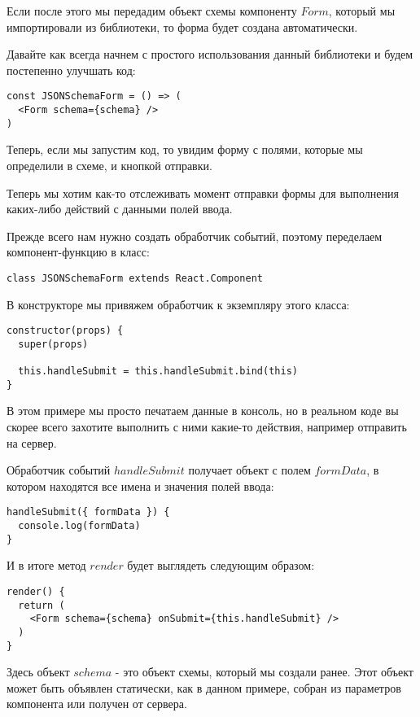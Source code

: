 Если после этого мы передадим объект схемы компоненту $Form$, который мы импортировали из библиотеки, то форма будет создана автоматически.

Давайте как всегда начнем с простого использования данный библиотеки и будем постепенно улучшать код:

\begin{lstlisting}
const JSONSchemaForm = () => (
  <Form schema={schema} />
)
\end{lstlisting}

Теперь, если мы запустим код, то увидим форму с полями, которые мы определили в схеме, и кнопкой отправки.

Теперь мы хотим как-то отслеживать момент отправки формы для выполнения каких-либо действий с данными полей ввода.

Прежде всего нам нужно создать обработчик событий, поэтому переделаем компонент-функцию в класс:

\begin{lstlisting}
class JSONSchemaForm extends React.Component
\end{lstlisting}

В конструкторе мы привяжем обработчик к экземпляру этого класса:

\begin{lstlisting}
constructor(props) {
  super(props)
  
  this.handleSubmit = this.handleSubmit.bind(this)
}
\end{lstlisting}

В этом примере мы просто печатаем данные в консоль, но в реальном коде вы скорее всего захотите выполнить с ними какие-то действия, например отправить на сервер.

Обработчик событий $handleSubmit$ получает объект с полем $formData$, в котором находятся все имена и значения полей ввода:

\begin{lstlisting}
handleSubmit({ formData }) {
  console.log(formData)
}
\end{lstlisting}

И в итоге метод $render$ будет выглядеть следующим образом:

\begin{lstlisting}
render() {
  return (
    <Form schema={schema} onSubmit={this.handleSubmit} />
  )
}
\end{lstlisting}

Здесь объект $schema$ - это объект схемы, который мы создали ранее. Этот объект может быть объявлен статически, как в данном примере, собран из параметров компонента или получен от сервера.

